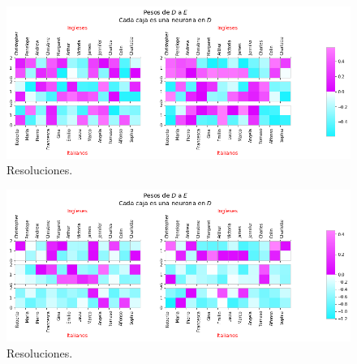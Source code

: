     \begin{figure}[h]
   \centering
   \includegraphics[scale=.5]{../Figuras/Hinton/r2.png}
   \caption{Resoluciones.}
  \label{fig:r2}
  \end{figure}

    \begin{figure}[h]
   \centering
   \includegraphics[scale=.5]{../Figuras/Hinton/r3.png}
   \caption{Resoluciones.}
  \label{fig:r3}
  \end{figure}
